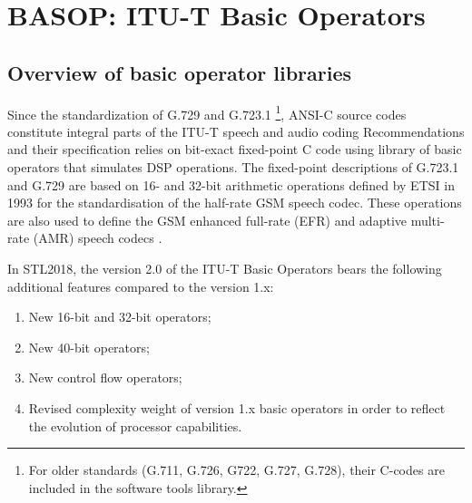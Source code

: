 \chapter{BASOP: ITU-T Basic Operators}

\def\newop20{\begin{math} \rightarrow \textsc{New in v2.0} \end{math}}

\section{Overview of basic operator libraries}

Since the standardization of G.729 and G.723.1
\footnote{For older standards (G.711, G.726, G722, G.727, G.728), their C-codes are included in the software tools library.},
ANSI-C source codes constitute integral parts of the ITU-T speech and audio coding Recommendations and their specification relies on bit-exact fixed-point C code using library of basic operators that simulates DSP operations.
The fixed-point descriptions of G.723.1 and G.729 are based on 16- and 32-bit arithmetic operations defined by ETSI in 1993 for the standardisation of the half-rate GSM speech codec.
These operations are also used to define the GSM enhanced full-rate (EFR) and adaptive multi-rate (AMR) speech codecs \cite{G.191}.

In STL2018, the version 2.0 of the ITU-T Basic Operators bears the following additional features compared to the version 1.x:
\begin{enumerate}
\item New 16-bit and 32-bit operators;
\item New 40-bit operators;
\item New control flow operators;
\item Revised complexity weight of version 1.x basic operators in order to reflect the evolution of processor capabilities.
\end{enumerate}

